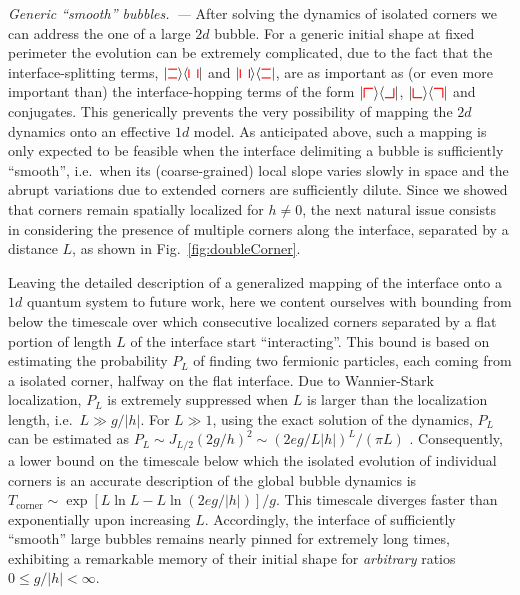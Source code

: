 \documentclass[reprint,aps,prl,superscriptaddress,english,nolongbibliography]{revtex4-2}
\newcommand{\sbra}[1]{\langle #1 |}
\newcommand{\sket}[1]{| #1 \rangle}
\newcommand{\urmove}[0]{%
\begin{tikzpicture}[baseline=0.1ex]%
\draw[thick, red] (0,1.5ex) -- (1.5ex,1.5ex);%
\draw[thick, red] (1.5ex,1.5ex) -- (1.5ex,0);%
\end{tikzpicture}%
}
\newcommand{\ulmove}[0]{%
\begin{tikzpicture}[baseline=0.1ex]%
\draw[thick, red] (0,1.5ex) -- (1.5ex,1.5ex);%
\draw[thick, red] (0,1.5ex) -- (0,0);%
\end{tikzpicture}%
}
\newcommand{\dlmove}[0]{%
\begin{tikzpicture}[baseline=0.1ex]%
\draw[thick, red] (0,1.5ex) -- (0,0);%
\draw[thick, red] (0,0) -- (1.5ex,0);%
\end{tikzpicture}%
}
\newcommand{\drmove}[0]{%
\begin{tikzpicture}[baseline=0.1ex]%
\draw[thick, red] (0,0) -- (1.5ex,0);%
\draw[thick, red] (1.5ex,1.5ex) -- (1.5ex,0ex);%
\end{tikzpicture}%
}
\newcommand{\vvmove}[0]{%
\begin{tikzpicture}[baseline=0.1ex]%
\draw[thick, red] (0,0) -- (0,1.5ex);%
\draw[thick, red] (1.5ex,0) -- (1.5ex,1.5ex);%
\end{tikzpicture}%
}
\newcommand{\hhmove}[0]{%
\begin{tikzpicture}[baseline=0.1ex]%
\draw[thick, red] (0,0) -- (1.5ex,0);%
\draw[thick, red] (1.5ex,1.5ex) -- (0,1.5ex);%
\end{tikzpicture}%
}
\begin{document}
\emph{Generic ``smooth'' bubbles.~---} After solving the dynamics of isolated corners we can address the one of a large $2d$ bubble. For a generic initial shape at fixed perimeter the evolution can be extremely complicated, due to the fact that the interface-splitting terms, $\sket{\hhmove}\sbra{\vvmove}$ and $\sket{\vvmove}\sbra{\hhmove}$, are as important as (or even more important than) the interface-hopping terms of the form $\sket{\ulmove}\sbra{\drmove}$, $\sket{\dlmove}\sbra{\urmove}$ and conjugates. This generically prevents the very possibility of mapping the $2d$ dynamics onto an effective $1d$ model. As anticipated above, such a mapping is only expected to be feasible when the interface delimiting a bubble is sufficiently ``smooth'', i.e.~when its (coarse-grained) local slope varies slowly in space and the abrupt variations due to extended corners are sufficiently dilute. Since we showed that corners remain spatially localized for $h\neq0$, the next natural issue consists in considering the presence of multiple corners along the interface, separated by a distance $L$, as shown in Fig.~\ref{fig:doubleCorner}.

Leaving the detailed description of a generalized mapping of the interface onto a $1d$ quantum system to future work, here we content ourselves with bounding from below the timescale over which consecutive localized corners separated by a flat portion of length $L$ of the interface start ``interacting''. This bound is based on estimating the probability $P_L$ of finding two fermionic particles, each coming from a isolated corner, halfway on the flat interface. Due to Wannier-Stark localization, $P_L$ is extremely suppressed when $L$ is larger than the localization length, i.e.\ $L\gg g/|h|$. For $L\gg 1$, using the exact solution of the dynamics, $P_L$ can be estimated as $P_L \sim J_{L/2}(2g/h)^2 \sim (2e g /L |h|)^{L} / (\pi L)$ \cite{Balducci2022Interface}. Consequently, a lower bound on the timescale below which the isolated evolution of individual corners is an accurate description of the global bubble dynamics is $T_{\mathrm{corner}}\sim \exp[L\ln L - L\ln (2e g/|h|)] / g$. This timescale diverges faster than exponentially upon increasing $L$. Accordingly, the interface of sufficiently ``smooth'' large bubbles remains nearly pinned for extremely long times, exhibiting a remarkable memory of their initial shape for \emph{arbitrary} ratios $0\le g/|h| < \infty$.
\end{document}
